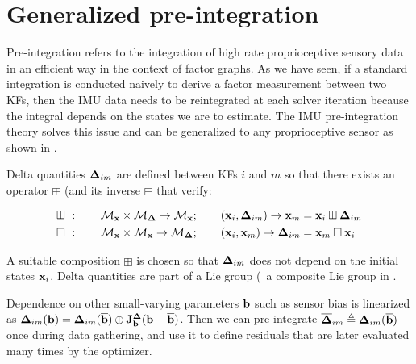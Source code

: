 \section{Generalized pre-integration}
\label{sec:general-preint}


Pre-integration refers to the integration of high rate proprioceptive sensory data in an efficient way in the context of factor graphs. 
As we have seen, if a standard integration is conducted naively to derive a factor measurement between two KFs, 
then the IMU data needs to be reintegrated at each solver iteration because the integral depends on the states we are to estimate. 
The IMU pre-integration theory solves this issue and can be generalized to any proprioceptive sensor as shown in \cite{atchuthan-18-thesis,deray-19-selfcalib,fourmy2021contact}. 

Delta quantities ${\bm \Delta}_{im}$ are defined between KFs $i$ and $m$ so that there exists an operator $\boxplus$ (and its inverse $\boxminus$ that verify:

\begin{align}
    \boxplus~&: \quad\quad \mathcal{M}_{{\bf x}} \times \mathcal{M}_{{\bm \Delta}} \rightarrow \mathcal{M}_{{\bf x}}; 
    \quad\quad ({\bf x}_i,{\bm \Delta}_{im}) \rightarrow {\bf x}_m={\bf x}_i\boxplus {\bm \Delta}_{im} \\
    \boxminus~&: \quad\quad \mathcal{M}_{{\bf x}} \times \mathcal{M}_{{\bf x}} \rightarrow \mathcal{M}_{{\bm \Delta}}; 
    \quad\quad ({\bf x}_i,{\bf x}_m) \rightarrow {\bm \Delta}_{im}={\bf x}_m\boxminus {\bf x}_i \\
\end{align}

A suitable composition $\boxplus$ is chosen so that ${\bm \Delta}_{im}$ does not depend on the initial states ${\bf x}_i$.
Delta quantities are part of a Lie group (\eg\ a composite Lie group in .

% 


Dependence on other small-varying parameters ${\bf b}$ such as sensor bias is linearized as ${\bm \Delta}_{im}({\bf b})={\bm \Delta}_{im}(\overline{{\bf b}})\oplus{\bf J}^{\bm \Delta}_{\bf b}({\bf b}-\overline{{\bf b}})$.
Then we can pre-integrate $\overline{{\bm \Delta}}_{im}\triangleq{\bm \Delta}_{im}(\overline{{\bf b}})$ once during data gathering, and use it to define residuals that are later evaluated many times by the optimizer.


